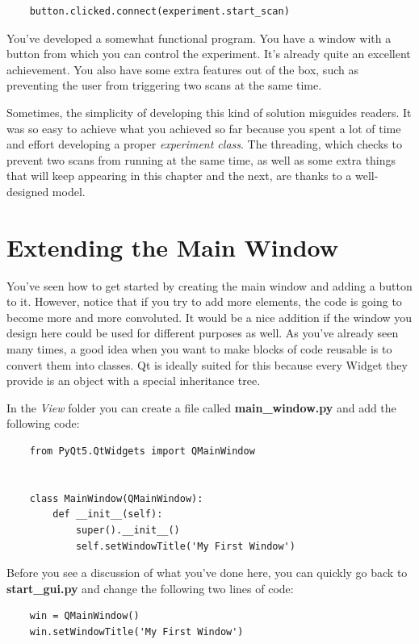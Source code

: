 \begin{verbatim}
    button.clicked.connect(experiment.start_scan)
\end{verbatim}

You've developed a somewhat functional program. You have a window with a button from which you can control the experiment. It's already quite an excellent achievement. You also have some extra features out of the box, such as preventing the user from triggering two scans at the same time.

Sometimes, the simplicity of developing this kind of solution misguides readers. It was so easy to achieve what you achieved so far because you spent a lot of time and effort developing a proper \emph{experiment class}. The threading, which checks to prevent two scans from running at the same time, as well as some extra things that will keep appearing in this chapter and the next, are thanks to a well-designed model.

\section{Extending the Main Window}\label{sec:extending-main-window}
You've seen how to get started by creating the main window and adding a button to it. However, notice that if you try to add more elements, the code is going to become more and more convoluted. It would be a nice addition if the window you design here could be used for different purposes as well. As you've already seen many times, a good idea when you want to make blocks of code reusable is to convert them into classes. Qt is ideally suited for this because every Widget they provide is an object with a special inheritance tree.

In the \emph{View} folder you can create a file called \textbf{main\_window.py} and add the following code:

\begin{verbatim}
    from PyQt5.QtWidgets import QMainWindow


    class MainWindow(QMainWindow):
        def __init__(self):
            super().__init__()
            self.setWindowTitle('My First Window')
\end{verbatim}

Before you see a discussion of what you've done here, you can quickly go back to \textbf{start\_gui.py} and change the following two lines of code:

\begin{verbatim}
    win = QMainWindow()
    win.setWindowTitle('My First Window')
\end{verbatim}

